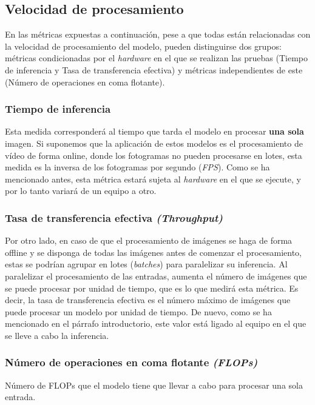 \documentclass[a4paper]{article}
\begin{document}
\subsection{Velocidad de procesamiento}
En las métricas expuestas a continuación, pese a que todas están relacionadas con la velocidad de procesamiento del modelo, pueden distinguirse dos grupos: métricas condicionadas por el \textit{hardware} en el que se realizan las pruebas (Tiempo de inferencia y Tasa de transferencia efectiva) y métricas independientes de este (Número de operaciones en coma flotante).

\subsubsection{Tiempo de inferencia}
Esta medida corresponderá al tiempo que tarda el modelo en procesar \textbf{una sola} imagen. Si suponemos que la aplicación de estos modelos es el procesamiento de vídeo de forma online, donde los fotogramas no pueden procesarse en lotes, esta medida es la inversa de los fotogramas por segundo (\textit{FPS}). 
Como se ha mencionado antes, esta métrica estará sujeta al \textit{hardware} en el que se ejecute, y por lo tanto variará de un equipo a otro.

\subsubsection{Tasa de transferencia efectiva \textit{(Throughput)}}
Por otro lado, en caso de que el procesamiento de imágenes se haga de forma offline y se disponga de todas las imágenes antes de comenzar el procesamiento, estas se podrían agrupar en lotes (\textit{batches}) para paralelizar su inferencia. Al paralelizar el procesamiento de las entradas, aumenta el número de imágenes que se puede procesar por unidad de tiempo, que es lo que medirá esta métrica. Es decir, la tasa de transferencia efectiva es el número máximo de imágenes que puede procesar un modelo por unidad de tiempo.
De nuevo, como se ha mencionado en el párrafo introductorio, este valor está ligado al equipo en el que se lleve a cabo la inferencia.

\subsubsection{Número de operaciones en coma flotante \textit{(FLOPs)}}
Número de FLOPs que el modelo tiene que llevar a cabo para procesar una sola entrada.
\end{document}
